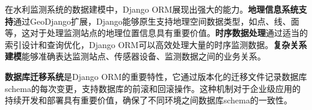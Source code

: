 在水利监测系统的数据建模中，Django ORM展现出强大的能力。\textbf{地理信息系统支持}通过GeoDjango扩展，Django能够原生支持地理空间数据类型，如点、线、面等，这对于处理监测站点的地理位置信息具有重要价值。\textbf{时序数据处理}通过适当的索引设计和查询优化，Django ORM可以高效处理大量的时序监测数据。\textbf{复杂关系建模}能够准确表达监测站点、传感器设备、监测数据之间的业务关系。

\textbf{数据库迁移系统}是Django ORM的重要特性，它通过版本化的迁移文件记录数据库schema的每次变更，支持数据库的前滚和回滚操作。这种机制对于企业级应用的持续开发和部署具有重要价值，确保了不同环境之间数据库schema的一致性。

\begin{Shaded}
\begin{Highlighting}[]
\OperatorTok{=}\OperatorTok{=}\OperatorTok{=}\NormalTok{)}
\OperatorTok{=}\OperatorTok{=}\NormalTok{)}
\OperatorTok{=}\OperatorTok{=}\NormalTok{)}
    
\OperatorTok{=} 
\OperatorTok{=} 
\OperatorTok{=} 


\end{Highlighting}
\end{Shaded}
